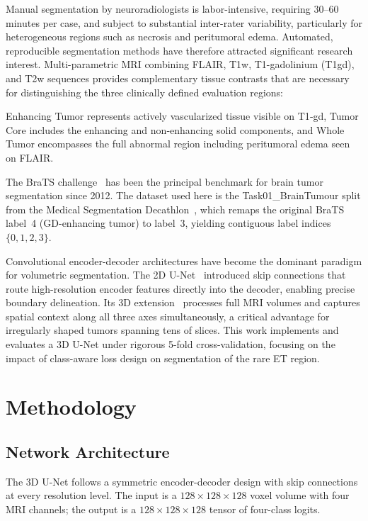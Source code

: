 \documentclass[10pt,twocolumn]{article}
\begin{document}
Manual segmentation by neuroradiologists is labor-intensive,
requiring 30--60 minutes per case, and subject to substantial
inter-rater variability, particularly for heterogeneous regions
such as necrosis and peritumoral edema. Automated, reproducible
segmentation methods have therefore attracted significant research
interest. Multi-parametric MRI  combining FLAIR, T1w,
T1-gadolinium (T1gd), and T2w sequences  provides
complementary tissue contrasts that are necessary for
distinguishing the three clinically defined evaluation regions:

Enhancing Tumor represents actively vascularized tissue visible on T1‑gd, Tumor Core includes the enhancing and non‑enhancing solid components, and Whole Tumor encompasses the full abnormal region including peritumoral edema seen on FLAIR.

The BraTS challenge~\cite{bakas2018,bakas2017,menze2015} has been
the principal benchmark for brain tumor segmentation since 2012.
The dataset used here is the Task01\_BrainTumour split from the
Medical Segmentation Decathlon~\cite{simpson2019}, which remaps
the original BraTS label~4 (GD-enhancing tumor) to label~3,
yielding contiguous label indices $\{0, 1, 2, 3\}$.

Convolutional encoder-decoder architectures have become the
dominant paradigm for volumetric segmentation. The 2D
U-Net~\cite{ronneberger2015} introduced skip connections that
route high-resolution encoder features directly into the decoder,
enabling precise boundary delineation. Its 3D
extension~\cite{cciccek2016} processes full MRI volumes and
captures spatial context along all three axes simultaneously, a
critical advantage for irregularly shaped tumors spanning tens of
slices. This work implements and evaluates a 3D U-Net under
rigorous 5-fold cross-validation, focusing on the impact of
class-aware loss design on segmentation of the rare ET region.

\section{Methodology}

\subsection{Network Architecture}

The 3D U-Net follows a symmetric encoder-decoder design with skip
connections at every resolution level. The input is a $128 \times
128 \times 128$ voxel volume with four MRI channels; the output
is a $128 \times 128 \times 128$ tensor of four-class logits.
\end{document}
